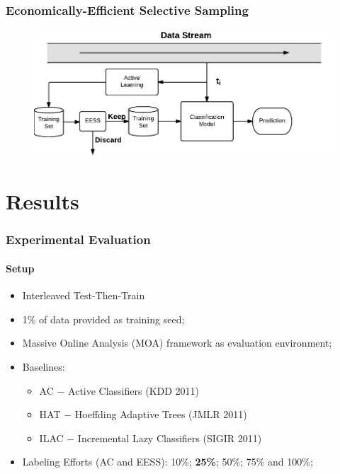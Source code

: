 \documentclass[14pt]{beamer}
\begin{document}
\begin{frame}\frametitle{Economically-Efficient Selective Sampling}
\begin{figure}
\centering
\includegraphics[scale=0.7]{EESS}
\end{figure}
\end{frame}

\section{Results}
\begin{frame}
\frametitle{Experimental Evaluation}
\framesubtitle{Setup}
\begin{itemize}
    \item Interleaved Test-Then-Train
    \item 1\% of data provided as training seed;
    \item Massive Online Analysis (MOA) framework as evaluation environment;
    \item Baselines:
    \begin{itemize}
      \item AC $-$ Active Classifiers (KDD 2011)
      \item HAT $-$ Hoeffding Adaptive Trees (JMLR 2011)
      \item ILAC $-$ Incremental Lazy Classifiers (SIGIR 2011)
    \end{itemize}
    \item Labeling Efforts (AC and EESS): 10\%; \textbf{25\%}; 50\%; 75\% and 100\%;
\end{itemize}

\end{frame}
\end{document}
